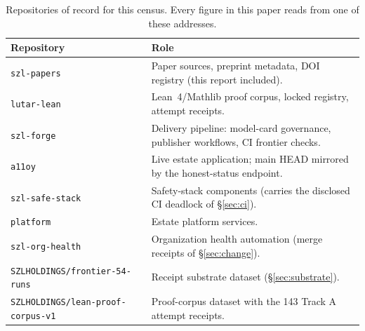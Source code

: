 ﻿\documentclass[11pt]{article}
\begin{document}
\begin{table}[htbp]
\centering
\small
\begin{tabular}{lp{8.8cm}}
\toprule
\textbf{Repository} & \textbf{Role} \\
\midrule
\texttt{szl-papers} & Paper sources, preprint metadata, DOI registry (this report included). \\
\texttt{lutar-lean} & Lean~4/Mathlib proof corpus, locked registry, attempt receipts. \\
\texttt{szl-forge} & Delivery pipeline: model-card governance, publisher workflows, CI frontier checks. \\
\texttt{a11oy} & Live estate application; main HEAD mirrored by the honest-status endpoint. \\
\texttt{szl-safe-stack} & Safety-stack components (carries the disclosed CI deadlock of \S\ref{sec:ci}). \\
\texttt{platform} & Estate platform services. \\
\texttt{szl-org-health} & Organization health automation (merge receipts of \S\ref{sec:change}). \\
\texttt{SZLHOLDINGS/frontier-54-runs} & Receipt substrate dataset (\S\ref{sec:substrate}). \\
\texttt{SZLHOLDINGS/lean-proof-corpus-v1} & Proof-corpus dataset with the 143 Track A attempt receipts. \\
\bottomrule
\end{tabular}
\caption{Repositories of record for this census. Every figure in this paper reads from one of these addresses.}
\label{tab:repos}
\end{table}
\end{document}
